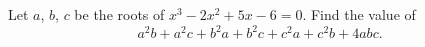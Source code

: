 Let $a$, $b$, $c$ be the roots of $x^3-2x^2+5x-6=0$. Find the value of
\[a^2b+a^2c+b^2a+b^2c+c^2a+c^2b+4abc.\]
